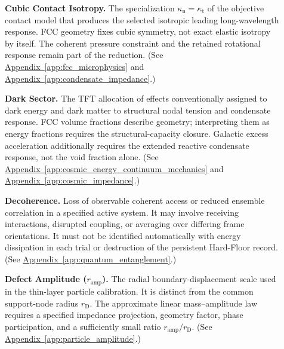 \begin{description}
\item[] \begin{minipage}[t]{\linewidth}
\textbf{Cubic Contact Isotropy.} The specialization $\kappa_{\mathrm n}=\kappa_{\mathrm t}$ of the objective contact model that produces the selected isotropic leading long-wavelength response. FCC geometry fixes cubic symmetry, not exact elastic isotropy by itself. The coherent pressure constraint and the retained rotational response remain part of the reduction.
(See \hyperref[app:fcc_microphysics]{Appendix~\ref*{app:fcc_microphysics}} and \hyperref[app:condensate_impedance]{Appendix~\ref*{app:condensate_impedance}}.)
\end{minipage}

\item[] \begin{minipage}[t]{\linewidth}
\textbf{Dark Sector.} The TFT allocation of effects conventionally assigned to dark energy and dark matter to structural nodal tension and condensate response. FCC volume fractions describe geometry; interpreting them as energy fractions requires the structural-capacity closure. Galactic excess acceleration additionally requires the extended reactive condensate response, not the void fraction alone.
(See \hyperref[app:cosmic_energy_continuum_mechanics]{Appendix~\ref*{app:cosmic_energy_continuum_mechanics}} and \hyperref[app:cosmic_impedance]{Appendix~\ref*{app:cosmic_impedance}}.)
\end{minipage}

\item[] \begin{minipage}[t]{\linewidth}
\textbf{Decoherence.} Loss of observable coherent access or reduced ensemble correlation in a specified active system. It may involve receiving interactions, disrupted coupling, or averaging over differing frame orientations. It must not be identified automatically with energy dissipation in each trial or destruction of the persistent Hard-Floor record.
(See \hyperref[app:quantum_entanglement]{Appendix~\ref*{app:quantum_entanglement}}.)
\end{minipage}

\item[] \begin{minipage}[t]{\linewidth}
\textbf{Defect Amplitude ($r_{\mathrm{amp}}$).} The radial boundary-displacement scale used in the thin-layer particle calibration. It is distinct from the common support-node radius $r_{\mathrm D}$. The approximate linear mass--amplitude law requires a specified impedance projection, geometry factor, phase participation, and a sufficiently small ratio $r_{\mathrm{amp}}/r_{\mathrm D}$.
(See \hyperref[app:particle_amplitude]{Appendix~\ref*{app:particle_amplitude}}.)
\end{minipage}


\end{description}
